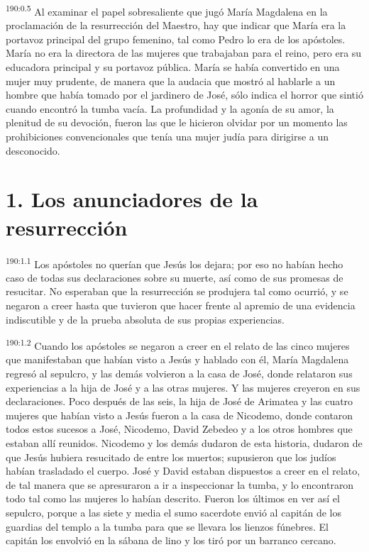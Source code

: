 \par
\textsuperscript{190:0.5} Al examinar el papel sobresaliente que jugó María Magdalena en la proclamación de la resurrección del Maestro, hay que indicar que María era la portavoz principal del grupo femenino, tal como Pedro lo era de los apóstoles. María no era la directora de las mujeres que trabajaban para el reino, pero era su educadora principal y su portavoz pública. María se había convertido en una mujer muy prudente, de manera que la audacia que mostró al hablarle a un hombre que había tomado por el jardinero de José, sólo indica el horror que sintió cuando encontró la tumba vacía. La profundidad y la agonía de su amor, la plenitud de su devoción, fueron las que le hicieron olvidar por un momento las prohibiciones convencionales que tenía una mujer judía para dirigirse a un desconocido.

\section*{1. Los anunciadores de la resurrección}
\par
\textsuperscript{190:1.1} Los apóstoles no querían que Jesús los dejara; por eso no habían hecho caso de todas sus declaraciones sobre su muerte, así como de sus promesas de resucitar. No esperaban que la resurrección se produjera tal como ocurrió, y se negaron a creer hasta que tuvieron que hacer frente al apremio de una evidencia indiscutible y de la prueba absoluta de sus propias experiencias.

\par
\textsuperscript{190:1.2} Cuando los apóstoles se negaron a creer en el relato de las cinco mujeres que manifestaban que habían visto a Jesús y hablado con él, María Magdalena regresó al sepulcro, y las demás volvieron a la casa de José, donde relataron sus experiencias a la hija de José y a las otras mujeres. Y las mujeres creyeron en sus declaraciones. Poco después de las seis, la hija de José de Arimatea y las cuatro mujeres que habían visto a Jesús fueron a la casa de Nicodemo, donde contaron todos estos sucesos a José, Nicodemo, David Zebedeo y a los otros hombres que estaban allí reunidos. Nicodemo y los demás dudaron de esta historia, dudaron de que Jesús hubiera resucitado de entre los muertos; supusieron que los judíos habían trasladado el cuerpo. José y David estaban dispuestos a creer en el relato, de tal manera que se apresuraron a ir a inspeccionar la tumba, y lo encontraron todo tal como las mujeres lo habían descrito. Fueron los últimos en ver así el sepulcro, porque a las siete y media el sumo sacerdote envió al capitán de los guardias del templo a la tumba para que se llevara los lienzos fúnebres. El capitán los envolvió en la sábana de lino y los tiró por un barranco cercano.

